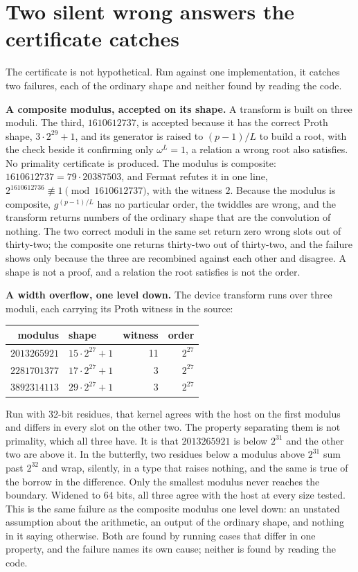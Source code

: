 \documentclass{article}
\begin{document}
\section{Two silent wrong answers the certificate catches}

The certificate is not hypothetical. Run against one implementation, it catches two failures, each of the ordinary shape and neither found by reading the code.

\textbf{A composite modulus, accepted on its shape.} A transform is built on three moduli. The third, \(1610612737\), is accepted because it has the correct Proth shape, \(3 \cdot 2^{29} + 1\), and its generator is raised to \((p-1)/L\) to build a root, with the check beside it confirming only \(\omega^L = 1\), a relation a wrong root also satisfies. No primality certificate is produced. The modulus is composite: \(1610612737 = 79 \cdot 20387503\), and Fermat refutes it in one line, \(2^{1610612736} \not\equiv 1 \pmod{1610612737}\), with the witness \(2\). Because the modulus is composite, \(g^{(p-1)/L}\) has no particular order, the twiddles are wrong, and the transform returns numbers of the ordinary shape that are the convolution of nothing. The two correct moduli in the same set return zero wrong slots out of thirty-two; the composite one returns thirty-two out of thirty-two, and the failure shows only because the three are recombined against each other and disagree. A shape is not a proof, and a relation the root satisfies is not the order.

\textbf{A width overflow, one level down.} The device transform runs over three moduli, each carrying its Proth witness in the source:

\begin{center}
\begin{tabular}{@{}rlrr@{}}
\toprule
modulus & shape & witness & order \\
\midrule
\(2013265921\) & \(15 \cdot 2^{27} + 1\) & 11 & \(2^{27}\) \\
\(2281701377\) & \(17 \cdot 2^{27} + 1\) & 3 & \(2^{27}\) \\
\(3892314113\) & \(29 \cdot 2^{27} + 1\) & 3 & \(2^{27}\) \\
\bottomrule
\end{tabular}
\end{center}

Run with 32-bit residues, that kernel agrees with the host on the first modulus and differs in every slot on the other two. The property separating them is not primality, which all three have. It is that \(2013265921\) is below \(2^{31}\) and the other two are above it. In the butterfly, two residues below a modulus above \(2^{31}\) sum past \(2^{32}\) and wrap, silently, in a type that raises nothing, and the same is true of the borrow in the difference. Only the smallest modulus never reaches the boundary. Widened to 64 bits, all three agree with the host at every size tested. This is the same failure as the composite modulus one level down: an unstated assumption about the arithmetic, an output of the ordinary shape, and nothing in it saying otherwise. Both are found by running cases that differ in one property, and the failure names its own cause; neither is found by reading the code.
\end{document}
